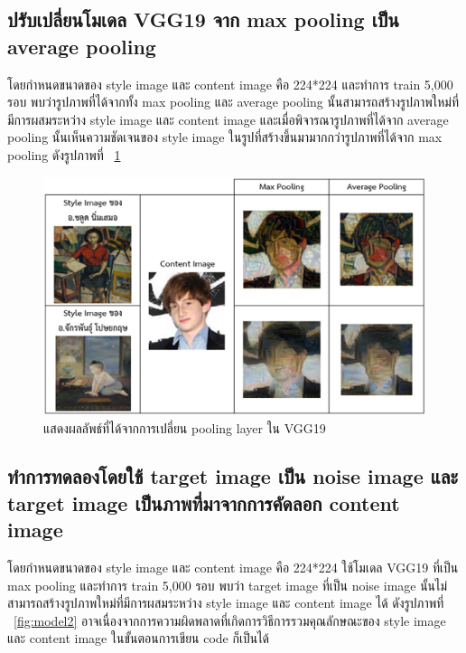 \documentclass[12pt,oneside,openright,a4paper]{cpe-thai-project}
\begin{document}
\subsection{ปรับเปลี่ยนโมเดล VGG19 จาก max pooling เป็น average pooling}
 โดยกำหนดขนาดของ style image และ content image คือ 224*224 และทำการ train 5,000 รอบ พบว่ารูปภาพที่ได้จากทั้ง max pooling และ average pooling นั้นสามารถสร้างรูปภาพใหม่ที่มีการผสมระหว่าง style image และ content image และเมื่อพิจารณารูปภาพที่ได้จาก average pooling นั้นเห็นความชัดเจนของ style image ในรูปที่สร้างขึ้นมามากกว่ารูปภาพที่ได้จาก max pooling ดังรูปภาพที่ ~\ref{fig:model1}

\begin{figure}[!h]
  \centering
  \includegraphics[width=12cm]{./image/model1.png}
  \caption{แสดงผลลัพธ์ที่ได้จากการเปลี่ยน pooling layer ใน VGG19}
  \label{fig:model1}
\end{figure}


\subsection{ทำการทดลองโดยใช้ target image เป็น noise image และ target image เป็นภาพที่มาจากการคัดลอก content image }
โดยกำหนดขนาดของ style image และ content image คือ 224*224 ใช้โมเดล VGG19 ที่เป็น max pooling และทำการ train 5,000 รอบ พบว่า target image ที่เป็น noise image นั้นไม่สามารถสร้างรูปภาพใหม่ที่มีการผสมระหว่าง style image และ content image ได้ ดังรูปภาพที่ ~\ref{fig:model2} อาจเนื่องจากการความผิดพลาดที่เกิดการวิธีการรวมคุณลักษณะของ style image และ content image ในขั้นตอนการเขียน code ก็เป็นได้
\end{document}
